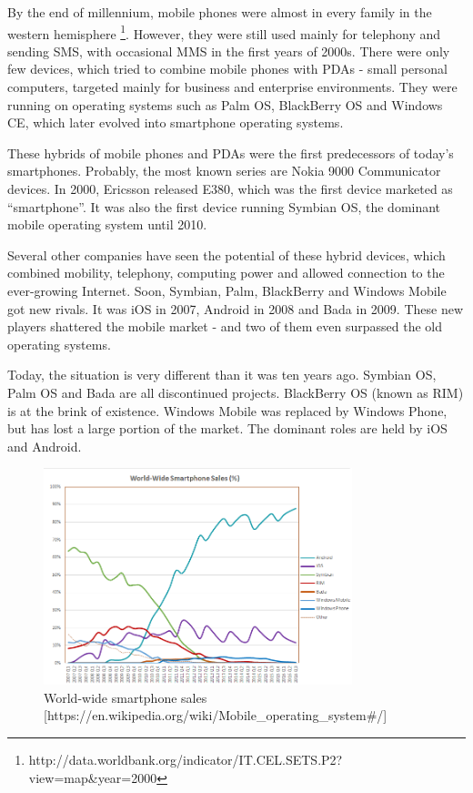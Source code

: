 \documentclass[english,master,public,dept460,male,cpdeclaration,oneside]{diploma}
\begin{document}
By the end of millennium, mobile phones were almost in every family in the western hemisphere \footnote{http://data.worldbank.org/indicator/IT.CEL.SETS.P2?view=map\&year=2000}. However, they were still used mainly for telephony and sending SMS, with occasional MMS in the first years of 2000s. There were only few devices, which tried to combine mobile phones with PDAs - small personal computers, targeted mainly for business and enterprise environments. They were running on operating systems such as Palm OS, BlackBerry OS and Windows CE, which later evolved into smartphone operating systems.

These hybrids of mobile phones and PDAs were the first predecessors of today’s smartphones. Probably, the most known series are Nokia 9000 Communicator devices. In 2000, Ericsson released E380, which was the first device marketed as “smartphone”. It was also the first device running Symbian OS, the dominant mobile operating system until 2010.

Several other companies have seen the potential of these hybrid devices, which combined mobility, telephony, computing power and allowed connection to the ever-growing Internet. Soon, Symbian, Palm, BlackBerry and Windows Mobile got new rivals. It was iOS in 2007, Android in 2008 and Bada in 2009. These new players shattered the mobile market - and two of them even surpassed the old operating systems. 

Today, the situation is very different than it was ten years ago. Symbian OS, Palm OS and Bada are all discontinued projects. BlackBerry OS (known as RIM) is at the brink of existence. Windows Mobile was replaced by Windows Phone, but has lost a large portion of the market. The dominant roles are held by iOS and Android.

\begin{figure}
	\centering\includegraphics[width=0.8\textwidth]{Figures/World_Wide_Smartphone_Sales_Share.png}
	\caption{World-wide smartphone sales [https://en.wikipedia.org/wiki/Mobile\_operating\_system\#/]}
\end{figure}
\end{document}
